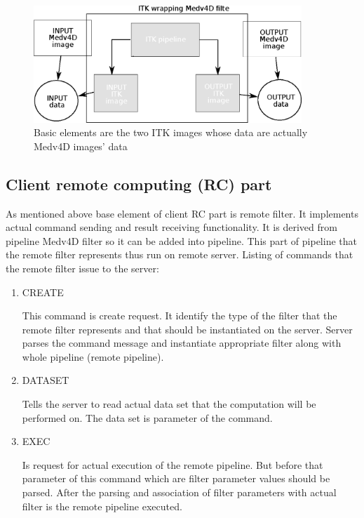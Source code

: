 \begin{figure}
    \centering
    \includegraphics[width=0.9\textwidth]{data/ITKFilter}
    \caption[ITK wrapper Medv4D filter]{Basic elements are the two ITK images whose data are actually Medv4D images' data}
    \label{fg:ITKWrapping}
\end{figure}

\subsection{Client remote computing (RC) part}

As mentioned above base element of client RC part is remote filter.
It implements actual command sending and result receiving functionality.
It is derived from pipeline Medv4D filter so it can be added into pipeline.
This part of pipeline that the remote filter represents thus run on remote server.
Listing of commands that the remote filter issue to the server:
\begin{enumerate}
  \item{CREATE}
  \par
  This command is create request.
It identify the type of the filter that the remote filter represents and that should be instantiated on the server.
Server parses the command message and instantiate appropriate filter along with whole pipeline (remote pipeline).

  \item{DATASET}
  \par
  Tells the server to read actual data set that the computation will be performed on.
The data set is parameter of the command.

  \item{EXEC}
\par
  Is request for actual execution of the remote pipeline.
But before that parameter of this command which are filter parameter values should be parsed.
After the parsing and association of filter parameters with actual filter is the remote pipeline executed.
\end{enumerate}

